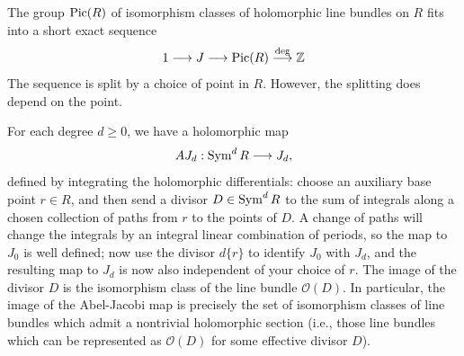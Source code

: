 \documentclass[12pt]{article}
\begin{document}
\begin{proposition}
The group $\operatorname{Pic}(R)$ of isomorphism classes of holomorphic line bundles on $R$
fits into a short exact sequence
\[
1 \longrightarrow J \longrightarrow \operatorname{Pic}(R)
\stackrel{\deg}{\longrightarrow} \mathbb{Z}
\]
The sequence is split by a choice of point in $R$. However, the splitting does depend on the point.
\end{proposition}

For each degree $d \ge 0$, we have a holomorphic map
\[
AJ_d : \operatorname{Sym}^d R \longrightarrow J_d,
\]
defined by integrating the holomorphic differentials:
choose an auxiliary base point $r \in R$, and then send a divisor
$D \in \operatorname{Sym}^d R$ to the sum of integrals along a chosen collection of paths
from $r$ to the points of $D$.
A change of paths will change the integrals by an integral linear combination of periods,
so the map to $J_0$ is well defined;
now use the divisor $d\{r\}$ to identify $J_0$ with $J_d$,
and the resulting map to $J_d$ is now also independent of your choice of $r$. The image of the divisor $D$
is the isomorphism class of the line bundle $\mathcal{O}(D)$. In particular, the image of the Abel-Jacobi map is precisely the set of isomorphism classes of line bundles which admit a nontrivial holomorphic section
(i.e., those line bundles which can be represented as $\mathcal{O}(D)$ for some effective divisor $D$).
\end{document}
